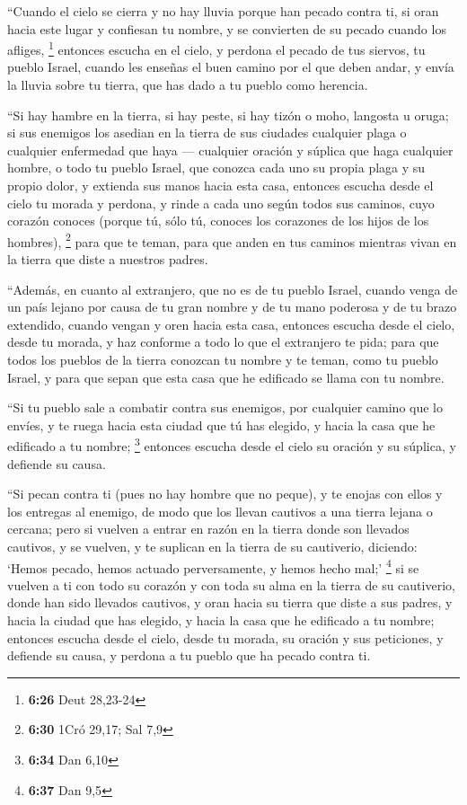  ``Cuando el cielo se cierra y no hay lluvia porque han
pecado contra ti, si oran hacia este lugar y confiesan tu nombre, y se
convierten de su pecado cuando los afliges, \footnote{\textbf{6:26} Deut
  28,23-24}  entonces escucha en el cielo, y perdona el
pecado de tus siervos, tu pueblo Israel, cuando les enseñas el buen
camino por el que deben andar, y envía la lluvia sobre tu tierra, que
has dado a tu pueblo como herencia.

 ``Si hay hambre en la tierra, si hay peste, si hay tizón
o moho, langosta u oruga; si sus enemigos los asedian en la tierra de
sus ciudades cualquier plaga o cualquier enfermedad que haya ---
 cualquier oración y súplica que haga cualquier hombre, o
todo tu pueblo Israel, que conozca cada uno su propia plaga y su propio
dolor, y extienda sus manos hacia esta casa,  entonces
escucha desde el cielo tu morada y perdona, y rinde a cada uno según
todos sus caminos, cuyo corazón conoces (porque tú, sólo tú, conoces los
corazones de los hijos de los hombres), \footnote{\textbf{6:30} 1Cró
  29,17; Sal 7,9}  para que te teman, para que anden en
tus caminos mientras vivan en la tierra que diste a nuestros padres.

 ``Además, en cuanto al extranjero, que no es de tu
pueblo Israel, cuando venga de un país lejano por causa de tu gran
nombre y de tu mano poderosa y de tu brazo extendido, cuando vengan y
oren hacia esta casa,  entonces escucha desde el cielo,
desde tu morada, y haz conforme a todo lo que el extranjero te pida;
para que todos los pueblos de la tierra conozcan tu nombre y te teman,
como tu pueblo Israel, y para que sepan que esta casa que he edificado
se llama con tu nombre.

 ``Si tu pueblo sale a combatir contra sus enemigos, por
cualquier camino que lo envíes, y te ruega hacia esta ciudad que tú has
elegido, y hacia la casa que he edificado a tu nombre; \footnote{\textbf{6:34}
  Dan 6,10}  entonces escucha desde el cielo su oración y
su súplica, y defiende su causa.

 ``Si pecan contra ti (pues no hay hombre que no peque),
y te enojas con ellos y los entregas al enemigo, de modo que los llevan
cautivos a una tierra lejana o cercana;  pero si vuelven
a entrar en razón en la tierra donde son llevados cautivos, y se
vuelven, y te suplican en la tierra de su cautiverio, diciendo: `Hemos
pecado, hemos actuado perversamente, y hemos hecho mal;' \footnote{\textbf{6:37}
  Dan 9,5}  si se vuelven a ti con todo su corazón y con
toda su alma en la tierra de su cautiverio, donde han sido llevados
cautivos, y oran hacia su tierra que diste a sus padres, y hacia la
ciudad que has elegido, y hacia la casa que he edificado a tu nombre;
 entonces escucha desde el cielo, desde tu morada, su
oración y sus peticiones, y defiende su causa, y perdona a tu pueblo que
ha pecado contra ti.

